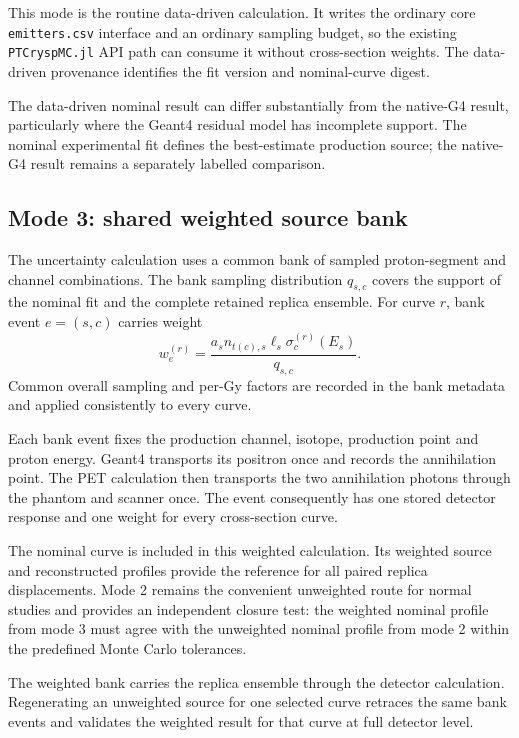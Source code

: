 \documentclass[11pt]{article}
\newcommand{\file}[1]{\texttt{#1}}
\begin{document}
This mode is the routine data-driven calculation.  It writes the ordinary core
\file{emitters.csv} interface and an ordinary sampling budget, so the existing
\file{PTCryspMC.jl} API path can consume it without cross-section weights.  The
data-driven provenance identifies the fit version and nominal-curve digest.

The data-driven nominal result can differ substantially from the native-G4
result, particularly where the Geant4 residual model has incomplete support.
The nominal experimental fit defines the best-estimate production source;
the native-G4 result remains a separately labelled comparison.

\subsection{Mode 3: shared weighted source bank}

The uncertainty calculation uses a common bank of sampled proton-segment and
channel combinations.  The bank sampling distribution $q_{s,c}$ covers the
support of the nominal fit and the complete retained replica ensemble.  For
curve $r$, bank event $e=(s,c)$ carries weight
\begin{equation}
 w_e^{(r)}=
 \frac{a_s n_{t(c),s}\ell_s\sigma_c^{(r)}(E_s)}{q_{s,c}}.
 \label{eq:event-weight}
\end{equation}
Common overall sampling and per-Gy factors are recorded in the bank metadata
and applied consistently to every curve.

Each bank event fixes the production channel, isotope, production point and
proton energy.  Geant4 transports its positron once and records the
annihilation point.  The PET calculation then transports the two annihilation
photons through the phantom and scanner once.  The event consequently has one
stored detector response and one weight for every cross-section curve.

The nominal curve is included in this weighted calculation.  Its weighted
source and reconstructed profiles provide the reference for all paired
replica displacements.  Mode 2 remains the convenient unweighted route for
normal studies and provides an independent closure test: the weighted nominal
profile from mode 3 must agree with the unweighted nominal profile from mode 2
within the predefined Monte Carlo tolerances.

The weighted bank carries the replica ensemble through the detector
calculation.  Regenerating an unweighted source for one selected curve
retraces the same bank events and validates the weighted result for that curve
at full detector level.
\end{document}
